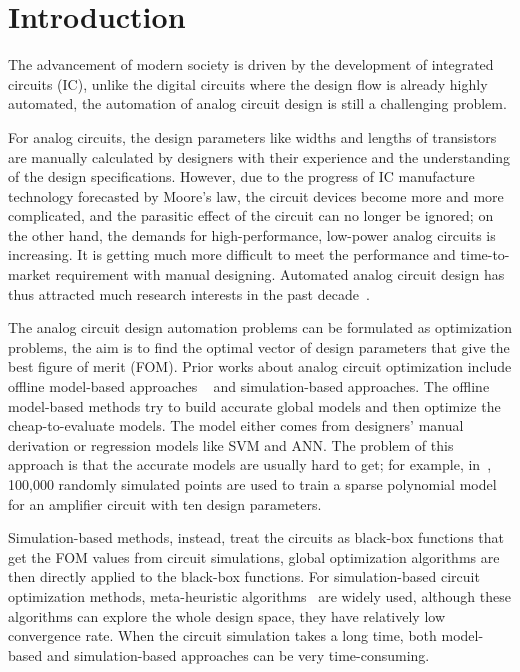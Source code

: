 \section{Introduction}

%
The advancement of modern society is driven by the development of integrated
circuits (IC), unlike the digital circuits where the design flow is already
highly automated, the automation of analog circuit design is still a
challenging problem. 

For analog circuits, the design parameters like widths and lengths of
transistors are manually calculated by designers with their experience and the
understanding of the design specifications. However, due to the progress of IC
manufacture technology forecasted by Moore's law, the circuit devices become
more and more complicated, and the parasitic effect of the circuit can no
longer be ignored; on the other hand, the demands for high-performance,
low-power analog circuits is increasing. It is getting much more difficult to
meet the performance and time-to-market requirement with manual designing.
Automated analog circuit design has thus attracted much research interests in
the past decade~\cite{rutenbar2007hierarchical}.

The analog circuit design automation problems can be formulated as optimization
problems, the aim is to find the optimal vector of design parameters that give
the best figure of merit (FOM). Prior works about analog circuit optimization
include offline model-based approaches
~\cite{colleran2003optimization,daems2003simulation,wang2014enabling} and
simulation-based approaches. The offline model-based methods try to build
accurate global models and then optimize the cheap-to-evaluate models. The
model either comes from designers' manual derivation or regression models like
SVM and ANN. The problem of this approach is that the accurate models are
usually hard to get; for example, in~\cite{wang2014enabling}, 100,000 randomly
simulated points are used to train a sparse polynomial model for an amplifier
circuit with ten design parameters. 

Simulation-based methods, instead, treat the circuits as black-box functions
that get the FOM values from circuit simulations, global optimization
algorithms are then directly applied to the black-box functions. For
simulation-based circuit optimization methods, meta-heuristic
algorithms~\cite{phelps2000anaconda, liu2009analog} are widely used, although
these algorithms can explore the whole design space, they have relatively low
convergence rate. When the circuit simulation takes a long time, both
model-based and simulation-based approaches can be very time-consuming.

